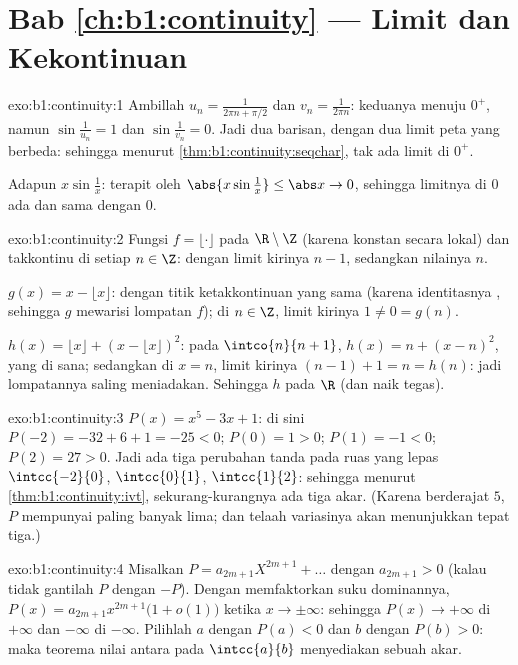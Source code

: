 \section*{Bab \ref{ch:b1:continuity} --- Limit dan Kekontinuan}

\begin{solution}{exo:b1:continuity:1}
Ambillah $u_n = \frac{1}{2\pi n + \pi/2}$ dan $v_n = \frac{1}{2\pi n}$:
keduanya menuju $0^+$, namun $\sin\frac{1}{u_n} = 1$ dan
$\sin\frac{1}{v_n} = 0$. Jadi dua barisan, dengan dua limit peta yang
berbeda: sehingga menurut \cref{thm:b1:continuity:seqchar}, tak ada limit di $0^+$.

Adapun $x \sin\frac1x$: terapit oleh $\abs{x\sin\frac1x} \leq \abs x \to 0$,
sehingga limitnya di $0$ ada dan sama dengan $0$.
\end{solution}

\begin{solution}{exo:b1:continuity:2}
Fungsi $f = \lfloor\cdot\rfloor$  pada $\R \setminus \Z$
(karena konstan secara lokal) dan takkontinu di setiap $n \in \Z$: dengan limit kirinya
$n - 1$, sedangkan nilainya $n$.

$g(x) = x - \lfloor x\rfloor$: dengan titik ketakkontinuan yang sama (karena
identitasnya , sehingga $g$ mewarisi lompatan $f$); di $n \in
\Z$, limit kirinya $1 \neq 0 = g(n)$.

$h(x) = \lfloor x\rfloor + (x - \lfloor x\rfloor)^2$: pada $\intco{n}{n
+ 1}$, $h(x) = n + (x - n)^2$, yang  di sana; sedangkan di $x = n$, limit
kirinya $(n-1) + 1 = n = h(n)$: jadi lompatannya saling meniadakan. Sehingga $h$ 
pada $\R$ (dan naik tegas).
\end{solution}

\begin{solution}{exo:b1:continuity:3}
$P(x) = x^5 - 3x + 1$: di sini $P(-2) = -32 + 6 + 1 = -25 < 0$; $P(0) = 1 >
0$; $P(1) = -1 < 0$; $P(2) = 27 > 0$. Jadi ada tiga perubahan tanda pada
ruas yang lepas $\intcc{-2}{0}$, $\intcc{0}{1}$, $\intcc{1}{2}$:
sehingga menurut \cref{thm:b1:continuity:ivt}, sekurang-kurangnya ada tiga akar. (Karena berderajat
$5$, $P$ mempunyai paling banyak lima; dan telaah variasinya akan menunjukkan
tepat tiga.)
\end{solution}

\begin{solution}{exo:b1:continuity:4}
Misalkan $P = a_{2m+1}X^{2m+1} + \dots$ dengan $a_{2m+1} > 0$ (kalau tidak gantilah
$P$ dengan $-P$). Dengan memfaktorkan suku dominannya, $P(x) = a_{2m+1}
x^{2m+1}\bigl(1 + o(1)\bigr)$ ketika $x \to \pm\infty$: sehingga $P(x) \to
+\infty$ di $+\infty$ dan $-\infty$ di $-\infty$. Pilihlah $a$ dengan
$P(a) < 0$ dan $b$ dengan $P(b) > 0$: maka teorema nilai antara pada
$\intcc{a}{b}$ menyediakan sebuah akar.
\end{solution}

